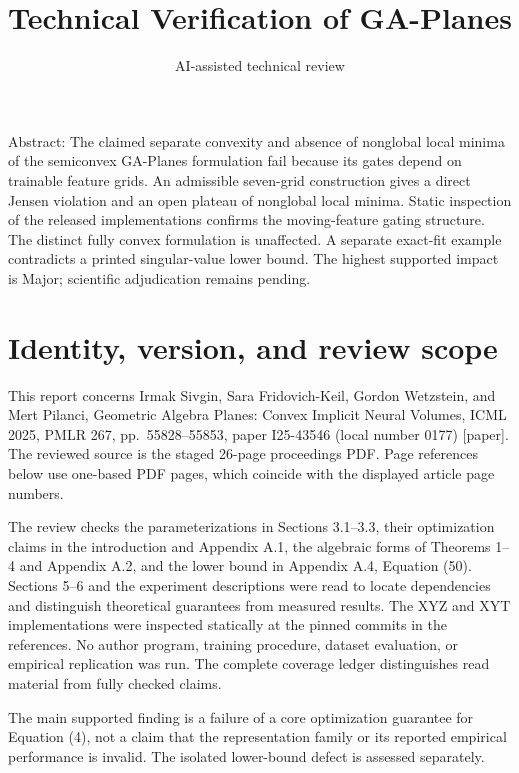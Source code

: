 \documentclass[10pt]{article}
\title{Technical Verification of GA-Planes}
\author{AI-assisted technical review}
\date{}
\begin{document}
\maketitle
Abstract: The claimed separate convexity and absence of nonglobal local minima of the semiconvex GA-Planes formulation fail because its gates depend on trainable feature grids. An admissible seven-grid construction gives a direct Jensen violation and an open plateau of nonglobal local minima. Static inspection of the released implementations confirms the moving-feature gating structure. The distinct fully convex formulation is unaffected. A separate exact-fit example contradicts a printed singular-value lower bound. The highest supported impact is Major; scientific adjudication remains pending.\par
\section*{Identity, version, and review scope}
This report concerns Irmak Sivgin, Sara Fridovich-Keil, Gordon Wetzstein, and Mert Pilanci, Geometric Algebra Planes: Convex Implicit Neural Volumes, ICML 2025, PMLR 267, pp. 55828–55853, paper I25-43546 (local number 0177) [paper]. The reviewed source is the staged 26-page proceedings PDF. Page references below use one-based PDF pages, which coincide with the displayed article page numbers.\par
The review checks the parameterizations in Sections 3.1–3.3, their optimization claims in the introduction and Appendix A.1, the algebraic forms of Theorems 1–4 and Appendix A.2, and the lower bound in Appendix A.4, Equation (50). Sections 5–6 and the experiment descriptions were read to locate dependencies and distinguish theoretical guarantees from measured results. The XYZ and XYT implementations were inspected statically at the pinned commits in the references. No author program, training procedure, dataset evaluation, or empirical replication was run. The complete coverage ledger distinguishes read material from fully checked claims.\par
The main supported finding is a failure of a core optimization guarantee for Equation (4), not a claim that the representation family or its reported empirical performance is invalid. The isolated lower-bound defect is assessed separately.\par
\end{document}
